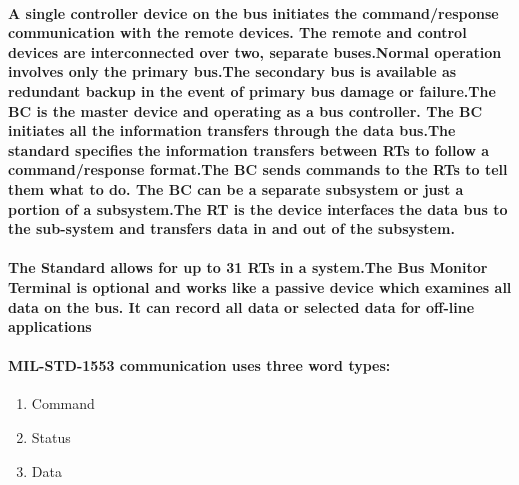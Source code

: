 \documentclass[12pt,a4paper]{report}
\begin{document}
\paragraph{\textrm{\textmd{A single controller device on the bus initiates the command/response communication with the remote devices. The remote and control devices are interconnected over two, separate buses.Normal operation involves only the primary bus.The secondary bus is available as redundant backup in the event of primary bus damage or failure.The BC is the master device and operating as a bus controller. The BC initiates all the information transfers through the data bus.The standard specifies the information transfers between RTs to follow a command/response format.The BC sends commands to the RTs to tell them what to do. The BC can be a separate subsystem or just a portion of a subsystem.The RT is the device interfaces the data bus to the sub-system and transfers data in and out of the subsystem.}}}			
\paragraph{\textrm{\textmd {The Standard allows for up to 31 RTs in a system.The Bus Monitor Terminal is optional and works like a passive device which examines all data on the bus. It can record all data or selected data for off-line applications}}}
\paragraph{\textrm {MIL-STD-1553 communication uses three word types:}}
\begin{enumerate}
	\item Command
	\item Status
	\item Data
\end{enumerate} 
\end{document}
